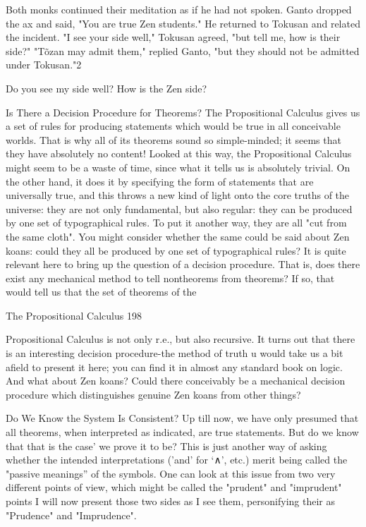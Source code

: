    Both monks continued their meditation as if he had not spoken. Ganto dropped the
   ax and said, "You are true Zen students." He returned to Tokusan and related the
   incident. "I see your side well," Tokusan agreed, "but tell me, how is their side?"
   "Tõzan may admit them," replied Ganto, "but they should not be admitted under
   Tokusan."2

Do you see my side well? How is the Zen side?

                 Is There a Decision Procedure for Theorems?
The Propositional Calculus gives us a set of rules for producing statements which would
be true in all conceivable worlds. That is why all of its theorems sound so simple-minded;
it seems that they have absolutely no content! Looked at this way, the Propositional
Calculus might seem to be a waste of time, since what it tells us is absolutely trivial. On
the other hand, it does it by specifying the form of statements that are universally true,
and this throws a new kind of light onto the core truths of the universe: they are not only
fundamental, but also regular: they can be produced by one set of typographical rules. To
put it another way, they are all "cut from the same cloth". You might consider whether
the same could be said about Zen koans: could they all be produced by one set of
typographical rules?
        It is quite relevant here to bring up the question of a decision procedure. That is,
does there exist any mechanical method to tell nontheorems from theorems? If so, that
would tell us that the set of theorems of the

The Propositional Calculus                                                              198

Propositional Calculus is not only r.e., but also recursive. It turns out that there is an
interesting decision procedure-the method of truth u would take us a bit afield to present
it here; you can find it in almost any standard book on logic. And what about Zen koans?
Could there conceivably be a mechanical decision procedure which distinguishes genuine
Zen koans from other things?

                     Do We Know the System Is Consistent?
Up till now, we have only presumed that all theorems, when interpreted as indicated, are
true statements. But do we know that that is the case' we prove it to be? This is just
another way of asking whether the intended interpretations ('and' for `∧', etc.) merit being
called the "passive meanings” of the symbols. One can look at this issue from two very
different points of view, which might be called the "prudent" and "imprudent" points I
will now present those two sides as I see them, personifying their as "Prudence" and
"Imprudence".

